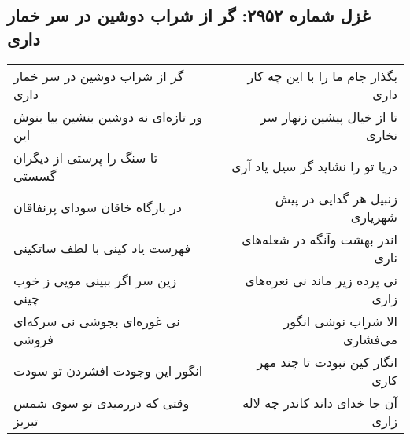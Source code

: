 \begin{center}
\section*{غزل شماره ۲۹۵۲: گر از شراب دوشین در سر خمار داری}
\label{sec:2952}
\begin{longtable}{l p{0.5cm} r}
گر از شراب دوشین در سر خمار داری
&&
بگذار جام ما را با این چه کار داری
\\
ور تازه‌ای نه دوشین بنشین بیا بنوش این
&&
تا از خیال پیشین زنهار سر نخاری
\\
تا سنگ را پرستی از دیگران گسستی
&&
دریا تو را نشاید گر سیل یاد آری
\\
در بارگاه خاقان سودای پرنفاقان
&&
زنبیل هر گدایی در پیش شهریاری
\\
فهرست یاد کینی با لطف ساتکینی
&&
اندر بهشت وآنگه در شعله‌های ناری
\\
زین سر اگر ببینی مویی ز خوب چینی
&&
نی پرده زیر ماند نی نعره‌های زاری
\\
نی غوره‌ای بجوشی نی سرکه‌ای فروشی
&&
الا شراب نوشی انگور می‌فشاری
\\
انگور این وجودت افشردن تو سودت
&&
انگار کین نبودت تا چند مهر کاری
\\
وقتی که دررمیدی تو سوی شمس تبریز
&&
آن جا خدای داند کاندر چه لاله زاری
\\
\end{longtable}
\end{center}
